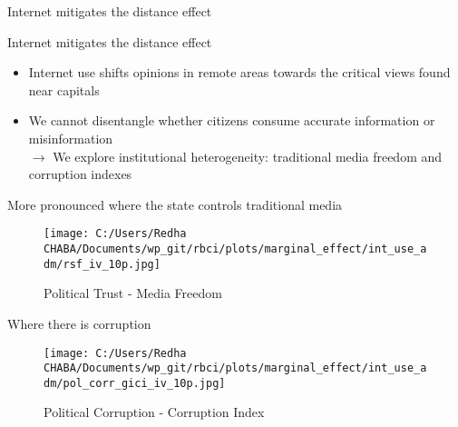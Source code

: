 \documentclass[aspectratio=169,xcolor=dvipsnames]{beamer}
\begin{document}
\begin{frame}{Internet mitigates the distance effect}
\begin{table}[H]
    \end{table}

\end{frame}


\begin{frame}{Internet mitigates the distance effect}
    \begin{itemize}
        \item Internet use shifts opinions in remote areas towards the critical views found near
capitals
\vfill
        \item We cannot disentangle whether citizens consume accurate information or misinformation\\
        \vfill
        $\rightarrow$ We explore institutional heterogeneity: traditional media freedom and corruption indexes
    \end{itemize}
\end{frame}

\begin{frame}{More pronounced where the state controls traditional media}
        \begin{figure}
    \centering
    \texttt{[image: C:/Users/Redha CHABA/Documents/wp\_git/rbci/plots/marginal\_effect/int\_use\_adm/rsf\_iv\_10p.jpg]}
    \caption{Political Trust - Media Freedom}
\end{figure}
\end{frame}


\begin{frame}{Where there is corruption}
        \begin{figure}
    \centering
    \texttt{[image: C:/Users/Redha CHABA/Documents/wp\_git/rbci/plots/marginal\_effect/int\_use\_adm/pol\_corr\_gici\_iv\_10p.jpg]}
    \caption{Political Corruption - Corruption Index}
\end{figure}
\end{frame}
\end{document}
